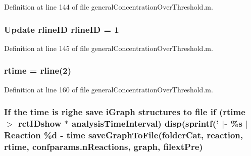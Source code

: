 Definition at line 144 of file general\+Concentration\+Over\+Threshold.\+m.

\hypertarget{a00028_a8443a49765859a8631fed7e8a1d27fe5}{
\subsubsection[{rline\+I\+D}]{\setlength{\rightskip}{0pt plus 5cm}Update rline\+I\+D rline\+I\+D = 1}}\label{a00028_a8443a49765859a8631fed7e8a1d27fe5}


Definition at line 145 of file general\+Concentration\+Over\+Threshold.\+m.

\hypertarget{a00028_afc6b38657a313b9f1de2ee356910b6ee}{
\subsubsection[{rtime}]{\setlength{\rightskip}{0pt plus 5cm}rtime = {\bf rline}(2)}}\label{a00028_afc6b38657a313b9f1de2ee356910b6ee}


Definition at line 160 of file general\+Concentration\+Over\+Threshold.\+m.

\hypertarget{a00028_a95b8ff8a27bbc7e771fa2fdd279f2465}{
\subsubsection[{save\+Graph\+To\+File}]{\setlength{\rightskip}{0pt plus 5cm}If the time is {\bf righe} save i\+Graph structures {\bf to} {\bf file} {\bf if} ({\bf rtime} $>$ {\bf rct\+I\+Dshow} $\ast$ analysis\+Time\+Interval) {\bf disp}(sprintf(' $\vert$-\/ \%s $\vert$ Reaction \%d -\/ time save\+Graph\+To\+File({\bf folder\+Cat}, {\bf reaction}, {\bf rtime}, {\bf confparams.\+n\+Reactions}, {\bf graph}, {\bf filext\+Pre})}}\label{a00028_a95b8ff8a27bbc7e771fa2fdd279f2465}


